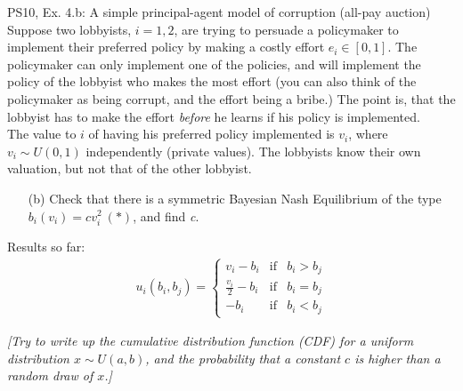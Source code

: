 \begin{frame}{PS10, Ex. 4.b: A simple principal-agent model of corruption (all-pay auction)}
    Suppose two lobbyists, $i = 1, 2$, are trying to persuade a policymaker to implement their preferred policy by making a costly effort $e_i\in[0, 1]$. The policymaker can only implement one of the policies, and will implement the policy of the lobbyist who makes the most effort (you can also think of the policymaker as being corrupt, and the effort being a bribe.) The point is, that the lobbyist has to make the effort \textit{before} he learns if his policy is implemented.\\\medskip
    The value to $i$ of having his preferred policy implemented is $v_i$, where $v_i\sim U(0, 1)$ independently (private values). The lobbyists know their own valuation, but not that of the other lobbyist.
    \begin{itemize}
      \item[(b)] Check that there is a symmetric Bayesian Nash Equilibrium of the type $b_i(v_i) = cv_i^2\ (*)$, and find \textit{c}.
    \end{itemize} \vspace{-8pt}
    \begin{multicols}{2}
      \vfill\null\columnbreak
      Results so far: \vspace{-6pt}
      \begin{align*}
        u_i(b_i,b_j)=\left\{\begin{array}{lcl}
          v_i-b_i           & \text{if} & b_i>b_j \\
          \frac{v_i}{2}-b_i & \text{if} & b_i=b_j \\
          -b_i              & \text{if} & b_i<b_j
        \end{array}\right.
      \end{align*}
      \vfill\null
    \end{multicols}
    \textit{[Try to write up the cumulative distribution function (CDF) for a uniform distribution $x\sim U(a, b)$, and the probability that a constant $c$ is higher than a random draw of $x$.]}
\end{frame}
